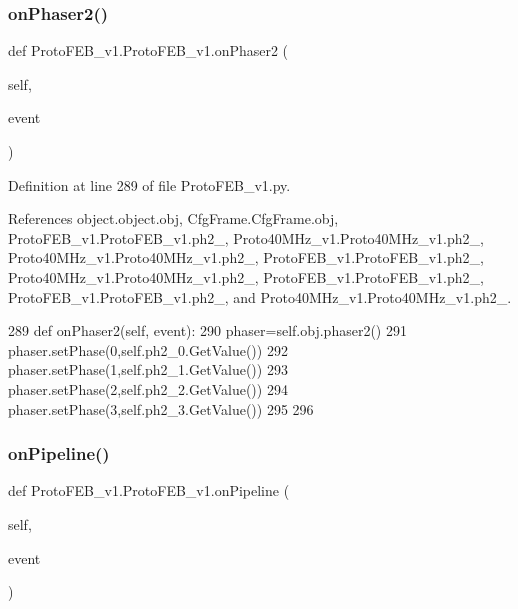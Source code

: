 \subsubsection{\texorpdfstring{on\+Phaser2()}{onPhaser2()}}
{\footnotesize\ttfamily def Proto\+F\+E\+B\+\_\+v1.\+Proto\+F\+E\+B\+\_\+v1.\+on\+Phaser2 (\begin{DoxyParamCaption}\item[{}]{self,  }\item[{}]{event }\end{DoxyParamCaption})}



Definition at line 289 of file Proto\+F\+E\+B\+\_\+v1.\+py.



References object.\+object.\+obj, Cfg\+Frame.\+Cfg\+Frame.\+obj, Proto\+F\+E\+B\+\_\+v1.\+Proto\+F\+E\+B\+\_\+v1.\+ph2\+\_, Proto40\+M\+Hz\+\_\+v1.\+Proto40\+M\+Hz\+\_\+v1.\+ph2\+\_, Proto40\+M\+Hz\+\_\+v1.\+Proto40\+M\+Hz\+\_\+v1.\+ph2\+\_, Proto\+F\+E\+B\+\_\+v1.\+Proto\+F\+E\+B\+\_\+v1.\+ph2\+\_, Proto40\+M\+Hz\+\_\+v1.\+Proto40\+M\+Hz\+\_\+v1.\+ph2\+\_, Proto\+F\+E\+B\+\_\+v1.\+Proto\+F\+E\+B\+\_\+v1.\+ph2\+\_, Proto\+F\+E\+B\+\_\+v1.\+Proto\+F\+E\+B\+\_\+v1.\+ph2\+\_, and Proto40\+M\+Hz\+\_\+v1.\+Proto40\+M\+Hz\+\_\+v1.\+ph2\+\_.


\begin{DoxyCode}
289     \textcolor{keyword}{def }onPhaser2(self, event):
290         phaser=self.obj.phaser2()
291         phaser.setPhase(0,self.ph2\_0.GetValue())
292         phaser.setPhase(1,self.ph2\_1.GetValue())
293         phaser.setPhase(2,self.ph2\_2.GetValue())
294         phaser.setPhase(3,self.ph2\_3.GetValue())
295 
296 
\end{DoxyCode}
\mbox{\label{classProtoFEB__v1_1_1ProtoFEB__v1_abee9bc133cd4291b011fc6f9746c945b}} 
\subsubsection{\texorpdfstring{on\+Pipeline()}{onPipeline()}}
{\footnotesize\ttfamily def Proto\+F\+E\+B\+\_\+v1.\+Proto\+F\+E\+B\+\_\+v1.\+on\+Pipeline (\begin{DoxyParamCaption}\item[{}]{self,  }\item[{}]{event }\end{DoxyParamCaption})}



